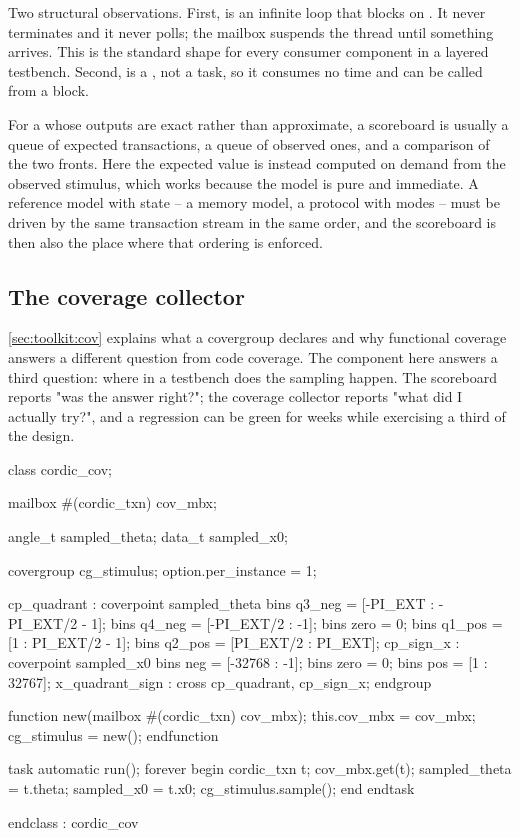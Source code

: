Two structural observations. First,  is an infinite loop that
blocks on . It never terminates and it never polls; the
mailbox suspends the thread until something arrives. This is the standard shape
for every consumer component in a layered testbench. Second,  is
a , not a task, so it consumes no time and can be called from a
 block.

For a \DUT{} whose outputs are exact rather than approximate, a scoreboard is
usually a queue of expected transactions, a queue of observed ones, and a
comparison of the two fronts. Here the expected value is instead computed on
demand from the observed stimulus, which works because the model is pure and
immediate. A reference model with state -- a memory model, a protocol with
modes -- must be driven by the same transaction stream in the same order, and
the scoreboard is then also the place where that ordering is enforced.

\subsection{The coverage collector}

\cref{sec:toolkit:cov} explains what a
covergroup declares and why functional coverage answers a different question
from code coverage. The component here answers a third question: where in a
testbench does the sampling happen. The scoreboard reports "was the answer
right?"; the coverage collector reports "what did I actually try?", and a
regression can be green for weeks while exercising a third of the design.

\begin{svcode}[caption={The coverage collector from \file{tb\_cordic\_pkg.sv}},label={lst:tb:cov}]
class cordic_cov;

  mailbox #(cordic_txn) cov_mbx;

  angle_t sampled_theta;
  data_t  sampled_x0;

  covergroup cg_stimulus;
    option.per_instance = 1;

    cp_quadrant : coverpoint sampled_theta {
      bins q3_neg = {[-PI_EXT     : -PI_EXT/2 - 1]};
      bins q4_neg = {[-PI_EXT/2   : -1]};
      bins zero   = {0};
      bins q1_pos = {[1           :  PI_EXT/2 - 1]};
      bins q2_pos = {[PI_EXT/2    :  PI_EXT]};
    }
    cp_sign_x : coverpoint sampled_x0 {
      bins neg  = {[-32768 : -1]};
      bins zero = {0};
      bins pos  = {[1 : 32767]};
    }
    x_quadrant_sign : cross cp_quadrant, cp_sign_x;
  endgroup

  function new(mailbox #(cordic_txn) cov_mbx);
    this.cov_mbx = cov_mbx;
    cg_stimulus  = new();
  endfunction

  task automatic run();
    forever begin
      cordic_txn t;
      cov_mbx.get(t);
      sampled_theta = t.theta;
      sampled_x0    = t.x0;
      cg_stimulus.sample();
    end
  endtask

endclass : cordic_cov
\end{svcode}

